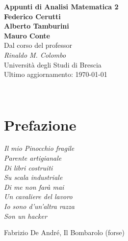 \documentclass[a4paper,twoside,italian,11pt]{book}
\begin{document}
\pagestyle{headings}

\frontmatter
\begin{titlepage}
	\begin{center}
		{\huge\bfseries Appunti di Analisi Matematica 2\\}
		\vspace{1.5cm}
		{\Large\bfseries Federico Cerutti\\Alberto Tamburini\\Mauro Conte\\}
		\vspace{2cm}
		{Dal corso del professor}\\[5pt]
		\emph{{Rinaldo M. Colombo}}\\[2cm]
		\vfill
		{Università degli Studi di Brescia}\\[10pt]
		{Ultimo aggiornamento: \today}
	\end{center}
\end{titlepage}

~%
\vfill%
\doclicenseThis%

\cleardoublepage%
\tableofcontents%


\mainmatter%
\chapter*{Prefazione}\label{chap:foreword}

\epigraph{\itshape%
	Il mio Pinocchio fragile\\
	Parente artigianale\\
	Di libri costruiti\\
	Su scala industriale\\
	Di me non farà mai\\
	Un cavaliere del lavoro\\
	Io sono d'un'altra razza\\
	Son un hacker
}{Fabrizio De André, Il Bombarolo (forse)}
\end{document}
